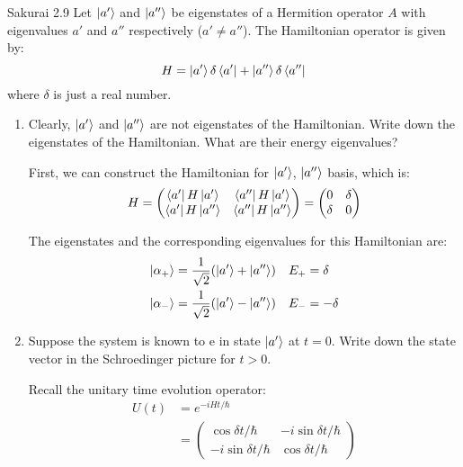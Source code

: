 \documentclass{article}
\begin{document}
\newpage
\begin{section}{Sakurai 2.9}
Let $\ket{a'}$ and $\ket{a''}$ be eigenstates of a Hermition operator $A$ with eigenvalues $a'$ and $a''$ respectively ($a' \neq a''$). The Hamiltonian operator is given by:
$$
	H = \ket{a'} \delta \bra{a'} + \ket{a''} \delta  \bra{a''}
$$
where $\delta$ is just a real number.
\begin{enumerate}
	\item Clearly, $\ket{a'}$ and $\ket{a''}$ are not eigenstates of the Hamiltonian. Write down the eigenstates of the Hamiltonian. What are their energy eigenvalues?

	\begin{tcolorbox}
		First, we can construct the Hamiltonian for $\ket{a'}$, $\ket{a''}$ basis, which is:
		\begin{align*}
			H = \begin{pmatrix}
				    \bra{a'}H\ket{a'}  & \bra{a''}H\ket{a'}  \\
				    \bra{a'}H\ket{a''} & \bra{a''}H\ket{a''}
			    \end{pmatrix}
			= \begin{pmatrix}
				  0      & \delta \\
				  \delta & 0
			  \end{pmatrix}
		\end{align*}

		The eigenstates and the corresponding eigenvalues for this Hamiltonian are:
		\begin{align*}
			\ket{\alpha_+} & = \frac{1}{\sqrt{2}} (\ket{a'} + \ket{a''}) & E_+ & = \delta  \\
			\ket{\alpha_-} & = \frac{1}{\sqrt{2}} (\ket{a'} - \ket{a''}) & E_- & = -\delta
		\end{align*}
	\end{tcolorbox}

	\item Suppose the system is known to e in state $\ket{a'}$ at $t=0$. Write down the state vector in the Schroedinger picture for $t > 0$.

	\begin{tcolorbox}
		Recall the unitary time evolution operator:
		\begin{align*}
			U(t) & = e^{-i H t / \hbar}                                \\
			     & = \begin{pmatrix}
				         \cos{\delta t/\hbar}    & -i \sin{\delta t/\hbar} \\
				         -i \sin{\delta t/\hbar} & \cos{\delta t/\hbar}
			         \end{pmatrix}
		\end{align*}


\end{tcolorbox}
\end{enumerate}
\end{section}
\end{document}
